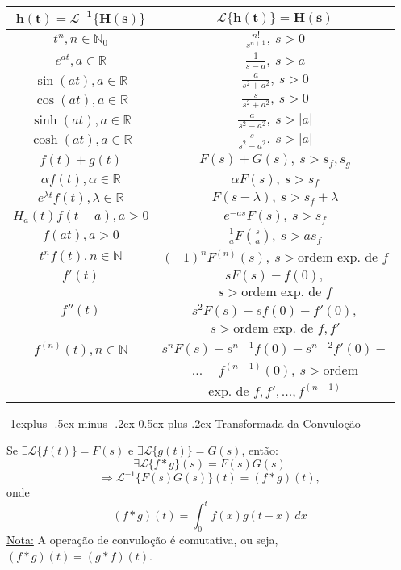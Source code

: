 \documentclass[10pt,landscape]{article}
\makeatletter
\newcommand{\Lagr}{\mathcal{L}}
\renewcommand{\subsection}{\@startsection{subsection}{2}{0mm}%
                                {-1explus -.5ex minus -.2ex}%
                                {0.5ex plus .2ex}%
                                {\normalfont\normalsize\bfseries}}
\makeatother
\begin{document}
\begin{multicols}{3}
\bgroup
\def\arraystretch{1.5}
\begin{tabular}{|c|c|}
\hline 
$\mathbf{h(t) = \Lagr^{-1}\{H(s)\}}$ & $\mathbf{\Lagr\{h(t)\} = H(s)}$ \\
\hline 
$t^n, n \in \mathbb{N}_0$ & $\frac{n!}{s^{n+1}},\ s > 0$ \\ 
\hline 
$e^{at}, a \in \mathbb{R}$ & $\frac{1}{s-a},\ s > a$ \\ 
\hline 
$\sin(at), a \in \mathbb{R}$ & $\frac{a}{s^2 + a^2},\ s > 0$ \\
\hline 
$\cos(at), a \in \mathbb{R}$ & $\frac{s}{s^2 + a^2},\ s > 0$ \\
\hline 
$\sinh(at), a \in \mathbb{R}$ & $\frac{a}{s^2 - a^2},\ s > |a|$\\
\hline
$\cosh(at), a \in \mathbb{R}$ & $\frac{s}{s^2 - a^2},\ s > |a|$\\
\hline
$f(t) + g(t)$ & $F(s) + G(s),\ s > s_f, s_g$\\
\hline 
$\alpha f(t), \alpha \in \mathbb{R}$ & $\alpha F(s),\ s > s_f$ \\ 
\hline 
$e^{\lambda t} f(t), \lambda \in \mathbb{R}$ & $F(s-\lambda),\ s > s_f + \lambda$ \\ 
\hline 
$H_a(t)f(t-a), a > 0$ & $e^{-as}F(s),\ s > s_f$ \\
\hline 
$f(at), a > 0$ & $\frac{1}{a}F(\frac{s}{a}),\ s > as_f$ \\
\hline 
$t^n f(t), n \in \mathbb{N}$ & $(-1)^n F^(n)(s),\ s > \text{ordem exp. de } f$\\
\hline
$f'(t)$ & $sF(s) - f(0),$\\
$ $ & $s > \text{ordem exp. de } f$\\
\hline
$f''(t)$ & $s^2 F(s) - sf(0) - f'(0),$\\
$ $ & $s > \text{ordem exp. de } f, f'$\\
\hline
$f^{(n)}(t), n \in \mathbb{N}$ & $s^n F(s) - s^{n-1} f(0) - s^{n-2} f'(0) - $\\
$ $ & $... - f^{(n-1)}(0),\ s > \text{ordem}$\\
$ $ & $\text{exp. de } f, f', ..., f^{(n-1)}$\\
\hline
\end{tabular}
\egroup

\subsection{Transformada da Convuloção}

Se $\exists \Lagr\{f(t)\} = F(s)$ e $\exists \Lagr\{g(t)\} = G(s)$, então:
$$\exists \Lagr\{f\ast g\}(s) = F(s)G(s)$$
$$\Rightarrow \Lagr^{-1}\{F(s)G(s)\}(t) = (f\ast g)(t),$$
onde
$$(f\ast g)(t) = \int_0^t f(x) g(t - x)\ dx$$
\underline{Nota:} A operação de convuloção é comutativa, ou seja, $(f\ast g)(t) = (g\ast f)(t)$.


\end{multicols}
\end{document}

